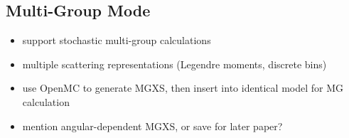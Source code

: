 \subsection{Multi-Group Mode}
\label{subsec:openmc-mg-mode}

\begin{itemize}[noitemsep]
\item support stochastic multi-group calculations
\item multiple scattering representations (Legendre moments, discrete bins)
\item use OpenMC to generate MGXS, then insert into identical model for MG calculation
\item mention angular-dependent MGXS, or save for later paper?
\end{itemize}